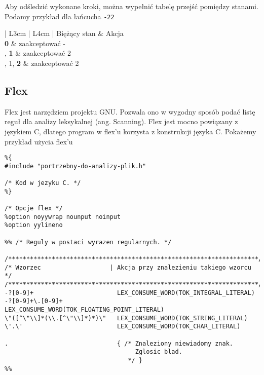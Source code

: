 \documentclass[leqno, 12pt]{article}
\newcommand{\spacing}{\vskip 0.5cm}
\begin{document}
			Aby odśledzić wykonane kroki, można wypełnić tabelę przejść pomiędzy stanami. Podamy przykład dla
			łańcucha \texttt{-22}

			\spacing
			\spacing

		\begin{center}
			\setlength{\tabcolsep}{0.5em}
			\renewcommand{\arraystretch}{1.2}
			\begin{tabular}{ | L{3cm} | L{4cm} | }
				\hline
				Biężący stan        & Akcja \\
				\hline
				\textbf{0}          & zaakceptować - \\
				, \textbf{1}       & zaakceptować 2 \\
				, 1, \textbf{2}    & zaakceptować 2 \\
				\hline
			\end{tabular}
		\end{center}
		
		\newpage

	\subsection{Flex}

		Flex jest narzędziem projektu GNU. Pozwala ono w wygodny sposób podać listę reguł dla analizy
		leksykalnej (ang. Scanning). Flex jest mocno powiązany z językiem C, dlatego program w flex'u
		korzysta z konstrukcji języka C. Pokażemy przykład użycia flex'u
		
		\spacing
		
\begin{lstlisting}
%{
#include "portrzebny-do-analizy-plik.h"

/* Kod w jezyku C. */
%}

/* Opcje flex */
%option noyywrap nounput noinput
%option yylineno

%% /* Reguly w postaci wyrazen regularnych. */

/*********************************************************************/
/* Wzorzec                   | Akcja przy znalezieniu takiego wzorcu */
/*********************************************************************/
-?[0-9]+                       LEX_CONSUME_WORD(TOK_INTEGRAL_LITERAL)
-?[0-9]+\.[0-9]+               LEX_CONSUME_WORD(TOK_FLOATING_POINT_LITERAL)
\"([^\"\\]*(\\.[^\"\\]*)*)\"   LEX_CONSUME_WORD(TOK_STRING_LITERAL)
\'.\'                          LEX_CONSUME_WORD(TOK_CHAR_LITERAL)

.                              { /* Znaleziony niewiadomy znak.
                                    Zglosic blad.
                                  */ }
%%
\end{lstlisting}
\end{document}
